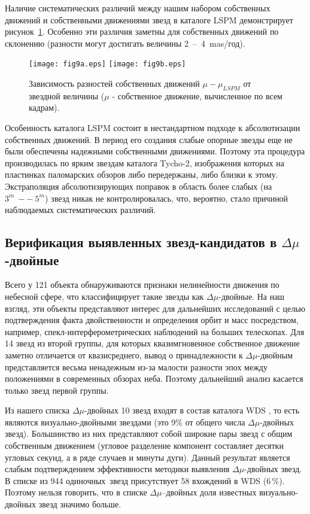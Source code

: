 Наличие систематических различий между нашим набором собственных движений и собственными движениями звезд в каталоге LSPM демонстрирует рисунок~\ref{fig:15dmu}. Особенно эти различия заметны для собственных движений по склонению (разности могут достигать величины 2~--~4~mas/год).
\begin{figure}[h]
\centering
\texttt{[image: fig9a.eps]}
\texttt{[image: fig9b.eps]}
\caption{Зависимость разностей собственных движений $\mu - \mu_{LSPM}$ от звездной величины ($\mu$ - собственное движение, вычисленное по всем кадрам).}
\label{fig:15dmu}
\end{figure}
Особенность каталога LSPM состоит в нестандартном подходе к абсолютизации собственных движений. В период его создания слабые опорные звезды еще не были обеспечены надежными собственными движениями. Поэтому эта процедура производилась по ярким звездам каталога Tycho-2, изображения которых на пластинках паломарских обзоров либо передержаны, либо близки к этому. Экстраполяция абсолютизирующих поправок в область более слабых (на $3^m~--~5^m$) звезд никак не контролировалась, что, вероятно, стало причиной наблюдаемых систематических различий.
\subsection{Верификация выявленных звезд-кандидатов в $\Delta\mu$-двойные} \label{subsec:ch3/sect3/sub3}
Всего у 121 объекта обнаруживаются признаки нелинейности движения по небесной сфере, что классифицирует такие звезды как $\Delta\mu$-двойные. На наш взгляд, эти объекты представляют интерес для дальнейших исследований с целью подтверждения факта двойственности и определения орбит и масс посредством, например,  спекл-интерферометрических наблюдений на больших телескопах. Для 14 звезд из второй группы, для которых квазимгновенное собственное движение заметно отличается от квазисреднего, вывод о принадлежности к $\Delta\mu$-двойным представляется весьма ненадежным из-за малости разности эпох между положениями в современных обзорах неба. Поэтому дальнейший анализ касается только звезд первой группы.

Из нашего списка $\Delta\mu$-двойных 10 звезд входят в состав каталога WDS , то есть являются визуально-двойными звездами (это 9\% от общего числа $\Delta\mu$-двойных звезд). Большинство из них представляют собой широкие пары звезд с общим собственным движением (угловое разделение компонент составляет десятки угловых секунд, а в ряде случаев и минуты дуги). Данный результат является слабым подтверждением эффективности методики выявления $\Delta\mu$-двойных звезд. В списке из 944 \glqq одиночных\grqq\ звезд присутствует 58 вхождений в WDS (6\,\%). Поэтому нельзя говорить, что в списке  $\Delta\mu$--двойных доля известных визуально-двойных звезд значимо больше.

